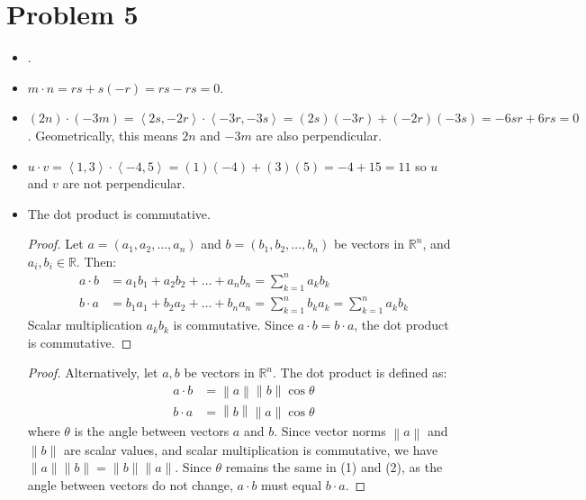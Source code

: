 \documentclass{article}
\newcommand*{\problem}[1]{\section*{Problem #1}}
\begin{document}
\problem{5}
\begin{itemize}
	\item[(a)] .

	\item[(b)] $m\cdot n=rs+s(-r)=rs-rs=\boxed{0}$.

	\item[(c)] $(2n)\cdot (-3m)=\left< 2s,-2r \right>\cdot \left< -3r,-3s \right>=(2s)(-3r)+(-2r)(-3s)=-6sr+6rs=0$. Geometrically, this means $2n$ and $-3m$ are also perpendicular.

	\item[(d)] $u\cdot v=\left< 1,3 \right>\cdot \left< -4,5 \right>=(1)(-4)+(3)(5)=-4+15=11$ so $u$ and $v$ are not perpendicular.

	\item[(e)] The dot product is commutative.

	\begin{proof}
		Let $a=(a_1,a_2,\ldots,a_n)$ and $b=(b_1,b_2,\ldots,b_n)$ be vectors in $\mathbb R^n$, and $a_i,b_i\in\mathbb R$. Then:
		\begin{align*}
		    a\cdot b 
			&=a_1b_1+a_2b_2+\ldots+a_nb_n
			=\sum_{k=1}^{n}a_kb_k \\
		    b\cdot a
			&=b_1a_1+b_2a_2+\ldots+b_na_n
			=\sum_{k=1}^{n}b_ka_k
			=\sum_{k=1}^{n}a_kb_k
		\end{align*}
		Scalar multiplication $a_kb_k$ is commutative. Since $a\cdot b=b\cdot a$, the dot product is commutative.
	\end{proof}
	\begin{proof}
		Alternatively, let $a,b$ be vectors in $\mathbb R^n$. The dot product is defined as:
		\begin{align}
		    a\cdot b
			&=\left\lVert a \right\rVert \lVert b \rVert \cos \theta \\
		    b\cdot a
			&=\left\lVert b \right\rVert \lVert a \rVert \cos \theta
		\end{align}
		where $\theta$ is the angle between vectors $a$ and $b$. Since vector norms $\left\lVert a \right\rVert$ and $\lVert b \rVert$ are scalar values, and scalar multiplication is commutative, we have $\lVert a \rVert \lVert b \rVert=\lVert b \rVert \lVert a \rVert$. Since $\theta$ remains the same in (1) and (2), as the angle between vectors do not change, $a\cdot b$ must equal $b\cdot a$.
	\end{proof}
\end{itemize}
\end{document}
